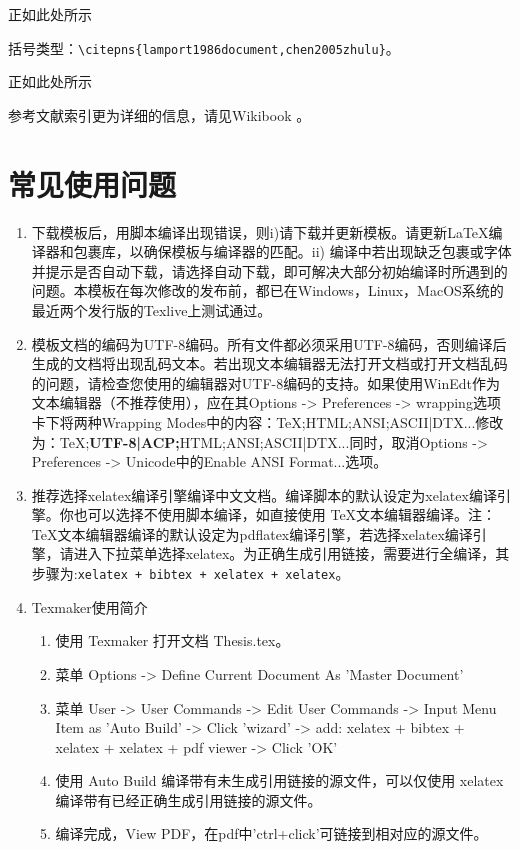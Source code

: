 正如此处所示

括号类型：\verb|\citepns{lamport1986document,chen2005zhulu}|。

正如此处所示

参考文献索引更为详细的信息，请见Wikibook\citep{wikibook2014latex} \nocite{*}。

\section{常见使用问题}\label{sec:qa}

\begin{enumerate}
    \item 下载模板后，用脚本编译出现错误，则i)请下载并更新模板。请更新\LaTeX{}编译器和包裹库，以确保模板与编译器的匹配。ii) 编译中若出现缺乏包裹或字体并提示是否自动下载，请选择自动下载，即可解决大部分初始编译时所遇到的问题。本模板在每次修改的发布前，都已在Windows，Linux，MacOS系统的最近两个发行版的Texlive上测试通过。

    \item 模板文档的编码为UTF-8编码。所有文件都必须采用UTF-8编码，否则编译后生成的文档将出现乱码文本。若出现文本编辑器无法打开文档或打开文档乱码的问题，请检查您使用的编辑器对UTF-8编码的支持。如果使用WinEdt作为文本编辑器（不推荐使用），应在其Options -> Preferences -> wrapping选项卡下将两种Wrapping Modes中的内容：TeX;HTML;ANSI;ASCII|DTX...修改为：TeX;\textbf{UTF-8|ACP;}HTML;ANSI;ASCII|DTX...同时，取消Options -> Preferences -> Unicode中的Enable ANSI Format...选项。

    \item 推荐选择xelatex编译引擎编译中文文档。编译脚本的默认设定为xelatex编译引擎。你也可以选择不使用脚本编译，如直接使用 \TeX{}文本编辑器编译。注：\TeX{}文本编辑器编译的默认设定为pdflatex编译引擎，若选择xelatex编译引擎，请进入下拉菜单选择xelatex。为正确生成引用链接，需要进行全编译，其步骤为:\verb|xelatex + bibtex + xelatex + xelatex|。
    \item Texmaker使用简介
        \begin{enumerate}
            \item 使用 Texmaker 打开文档 Thesis.tex。
            \item 菜单 Options -> Define Current Document As 'Master Document'
            \item 菜单 User -> User Commands -> Edit User Commands -> Input Menu Item as 'Auto Build' -> Click 'wizard' -> add: xelatex + bibtex + xelatex + xelatex + pdf viewer -> Click 'OK'
            \item 使用 Auto Build 编译带有未生成引用链接的源文件，可以仅使用 xelatex 编译带有已经正确生成引用链接的源文件。
            \item 编译完成，View PDF，在pdf中'ctrl+click'可链接到相对应的源文件。
        \end{enumerate}


\end{enumerate}
